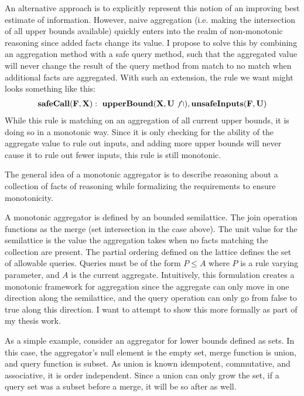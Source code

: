 An alternative approach is to explicitly represent this notion of an improving best estimate of information.
However, naive aggregation (i.e. making the intersection of all upper bounds available) quickly enters into the realm of non-monotonic reasoning since added facts change its value.
I propose to solve this by combining an aggregation method with a safe query method, such that the aggregated value will never change the result of the query method from match to no match when additional facts are aggregated.
With such an extension, the rule we want might looks something like this:
\begin{gather*}
        {\bf safeCall}({\bf F}, {\bf X}) :~ {\bf upperBound}({\bf X}, {\bf U} \not \cap), {\bf unsafeInputs}({\bf F}, {\bf U})
\end{gather*}
While this rule is matching on an aggregation of all current upper bounds, it is doing so in a monotonic way.
Since it is only checking for the ability of the aggregate value to rule out inputs, and adding more upper bounds will never cause it to rule out fewer inputs, this rule is still monotonic.

The general idea of a monotonic aggregator is to describe reasoning about a collection of facts of reasoning while formalizing the requirements to ensure monotonicity.

A monotonic aggregator is defined by an bounded semilattice.
The join operation functions as the merge (set intersection in the case above).
The unit value for the semilattice is the value the aggregation takes when no facts matching the collection are present.
The partial ordering defined on the lattice defines the set of allowable queries.
Queries must be of the form $P \leq A$ where $P$ is a rule varying parameter, and $A$ is the current aggregate.
Intuitively, this formulation creates a monotonic framework for aggregation since the aggregate can only move in one direction along the semilattice, and the query operation can only go from false to true along this direction.
I want to attempt to show this more formally as part of my thesis work.

As a simple example, consider an aggregator for lower bounds defined as sets.
In this case, the aggregator's null element is the empty set, merge function is union, and query function is subset.
As union is known idempotent, commutative, and associative, it is order independent.
Since a union can only grow the set, if a query set was a subset before a merge, it will be so after as well.

